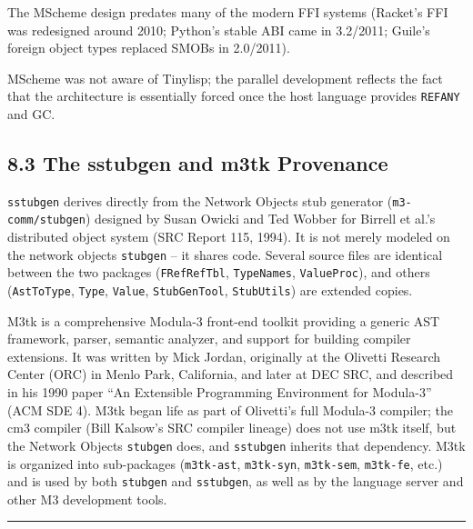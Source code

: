 \documentclass[
  12pt,
]{report}
\newcommand{\passthrough}[1]{#1}
\begin{document}
The MScheme design predates many of the modern FFI systems (Racket's FFI
was redesigned around 2010; Python's stable ABI came in 3.2/2011;
Guile's foreign object types replaced SMOBs in 2.0/2011).

MScheme was not aware of Tinylisp; the parallel development reflects the
fact that the architecture is essentially forced once the host language
provides \passthrough{\lstinline!REFANY!} and GC.

\subsection{8.3 The sstubgen and m3tk
Provenance}\label{the-sstubgen-and-m3tk-provenance}

\passthrough{\lstinline!sstubgen!} derives directly from the Network
Objects stub generator (\passthrough{\lstinline!m3-comm/stubgen!})
designed by Susan Owicki and Ted Wobber for Birrell et al.'s distributed
object system (SRC Report 115, 1994). It is not merely modeled on the
network objects \passthrough{\lstinline!stubgen!} -- it shares code.
Several source files are identical between the two packages
(\passthrough{\lstinline!FRefRefTbl!},
\passthrough{\lstinline!TypeNames!},
\passthrough{\lstinline!ValueProc!}), and others
(\passthrough{\lstinline!AstToType!}, \passthrough{\lstinline!Type!},
\passthrough{\lstinline!Value!}, \passthrough{\lstinline!StubGenTool!},
\passthrough{\lstinline!StubUtils!}) are extended copies.

M3tk is a comprehensive Modula-3 front-end toolkit providing a generic
AST framework, parser, semantic analyzer, and support for building
compiler extensions. It was written by Mick Jordan, originally at the
Olivetti Research Center (ORC) in Menlo Park, California, and later at
DEC SRC, and described in his 1990 paper ``An Extensible Programming
Environment for Modula-3'' (ACM SDE 4). M3tk began life as part of
Olivetti's full Modula-3 compiler; the cm3 compiler (Bill Kalsow's SRC
compiler lineage) does not use m3tk itself, but the Network Objects
\passthrough{\lstinline!stubgen!} does, and
\passthrough{\lstinline!sstubgen!} inherits that dependency. M3tk is
organized into sub-packages (\passthrough{\lstinline!m3tk-ast!},
\passthrough{\lstinline!m3tk-syn!}, \passthrough{\lstinline!m3tk-sem!},
\passthrough{\lstinline!m3tk-fe!}, etc.) and is used by both
\passthrough{\lstinline!stubgen!} and
\passthrough{\lstinline!sstubgen!}, as well as by the language server
and other M3 development tools.

\begin{center}\rule{0.5\linewidth}{0.5pt}\end{center}
\end{document}
